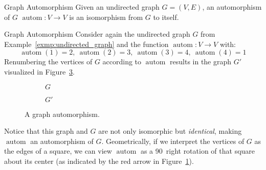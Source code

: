 \begin{defn}[label=defn:graph_automorphisms]{Graph Automorphism}
  Given an undirected graph ${G = (V, E)}$, an automorphism of $G$
  ${\operatorname{autom}: V \rightarrow V}$ is an isomorphism from $G$ to itself.
\end{defn}

\begin{exmp}[label=exmp:graph_automorphisms]{Graph Automorphism}
  Consider again the undirected graph $G$ from
  Example~\ref{exmp:undirected_graph} and the function ${\operatorname{autom}: V
  \rightarrow V}$ with:
  \begin{equation*}
    \operatorname{autom}(1) = 2,\ \operatorname{autom}(2) = 3,\
    \operatorname{autom}(3) = 4,\ \operatorname{autom}(4) = 1
  \end{equation*}
  Renumbering the vertices of $G$ according to $\operatorname{autom}$ results
  in the graph $G'$ visualized in
  Figure~\ref{fig:undirected_graph_automorphism_b}.
  \begin{figure}[H]
    \centering
    \begin{subfigure}{.3\textwidth}
      \centering
      \caption{$G$}
      \label{fig:undirected_graph_automorphism_a}
    \end{subfigure}
    \begin{subfigure}{.3\textwidth}
      \centering
      \caption{$G'$}
      \label{fig:undirected_graph_automorphism_b}
    \end{subfigure}
    \caption{A graph automorphism.}
  \end{figure}
  \noindent
  Notice that this graph and $G$ are not only isomorphic but
  \textit{identical}, making $\operatorname{autom}$ an automorphism of $G$.
  Geometrically, if we interpret the vertices of $G$ as the edges of a square, we
  can view $\operatorname{autom}$ as a 90\degree\ right rotation of that
  square about its center (as indicated by the red arrow in
  Figure~\ref{fig:undirected_graph_automorphism_a}).
\end{exmp}
